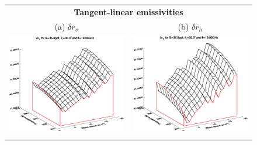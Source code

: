 \begin{figure}[htp]
  \centering
  \begin{tabular}{c c}
    \multicolumn{2}{c}{\sffamily\textbf{Tangent-linear emissivities}}\\
    \textsf{(a)} $\delta r_v$ &
    \textsf{(b)} $\delta r_h$ \\
    \includegraphics[bb=120 240 508 540,clip,scale=0.5]{graphics/Model/TLAD/ev_TL_s35.0ppt_z30.0_19.00GHz.eps} &
    \includegraphics[bb=120 240 508 540,clip,scale=0.5]{graphics/Model/TLAD/eh_TL_s35.0ppt_z30.0_19.00GHz.eps} \\\\

\end{tabular}
\end{figure}
